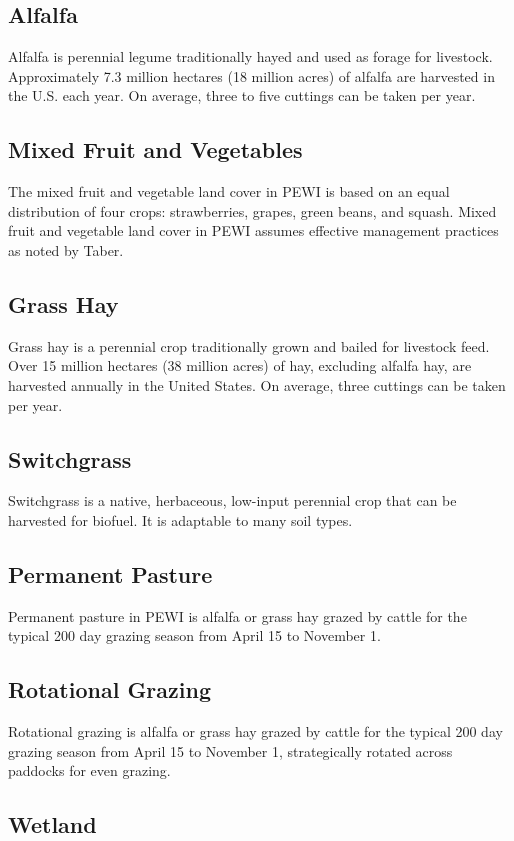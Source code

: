 \documentclass[11pt]{article}
\begin{document}
\subsection{Alfalfa}
Alfalfa is perennial legume traditionally hayed and used as forage for livestock. Approximately 7.3 million hectares (18 million acres) of alfalfa are harvested in the U.S. each year\cite{5}.  On average, three to five cuttings can be taken per year.

\subsection{Mixed Fruit and Vegetables}
The mixed fruit and vegetable land cover in PEWI is based on an equal distribution of four crops: strawberries, grapes, green beans, and squash. Mixed fruit and vegetable land cover in PEWI assumes effective management practices as noted by Taber.

\subsection{Grass Hay}
Grass hay is a perennial crop traditionally grown and bailed for livestock feed. Over 15 million hectares (38 million acres) of hay, excluding alfalfa hay, are harvested annually in the United States. On average, three cuttings can be taken per year. 

\subsection{Switchgrass}
Switchgrass is a native, herbaceous, low-input perennial crop that can be harvested for biofuel. It is adaptable to many soil types.

\subsection{Permanent Pasture}
Permanent pasture in PEWI is alfalfa or grass hay grazed by cattle for the typical 200 day grazing season from April 15 to November 1.\cite{10}

\subsection{Rotational Grazing}
Rotational grazing is alfalfa or grass hay grazed by cattle for the typical 200 day grazing season from April 15 to November 1, strategically rotated across paddocks for even grazing.\cite{11}

\subsection{Wetland}
\end{document}
